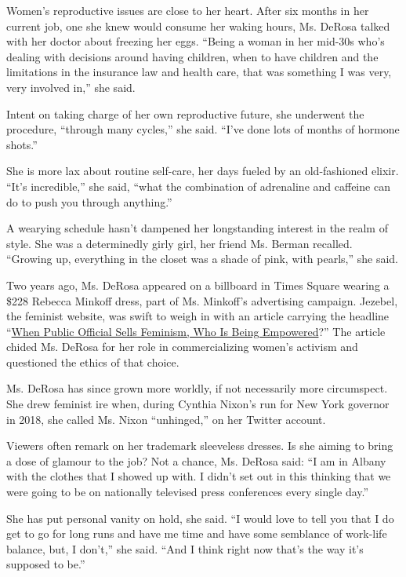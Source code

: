 Women's reproductive issues are close to her heart. After six months in
her current job, one she knew would consume her waking hours, Ms. DeRosa
talked with her doctor about freezing her eggs. ``Being a woman in her
mid-30s who's dealing with decisions around having children, when to
have children and the limitations in the insurance law and health care,
that was something I was very, very involved in,'' she said.

Intent on taking charge of her own reproductive future, she underwent
the procedure, ``through many cycles,'' she said. ``I've done lots of
months of hormone shots.''

She is more lax about routine self-care, her days fueled by an
old-fashioned elixir. ``It's incredible,'' she said, ``what the
combination of adrenaline and caffeine can do to push you through
anything.''

A wearying schedule hasn't dampened her longstanding interest in the
realm of style. She was a determinedly girly girl, her friend Ms. Berman
recalled. ``Growing up, everything in the closet was a shade of pink,
with pearls,'' she said.

Two years ago, Ms. DeRosa appeared on a billboard in Times Square
wearing a \$228 Rebecca Minkoff dress, part of Ms. Minkoff's advertising
campaign. Jezebel, the feminist website, was swift to weigh in with an
article carrying the headline
``\href{https://theslot.jezebel.com/when-a-public-official-sells-feminism-who-is-being-emp-1824125092}{When
Public Official Sells Feminism, Who Is Being Empowered}?'' The article
chided Ms. DeRosa for her role in commercializing women's activism and
questioned the ethics of that choice.

Ms. DeRosa has since grown more worldly, if not necessarily more
circumspect. She drew feminist ire when, during Cynthia Nixon's run for
New York governor in 2018, she called Ms. Nixon ``unhinged,'' on her
Twitter account.

Viewers often remark on her trademark sleeveless dresses. Is she aiming
to bring a dose of glamour to the job? Not a chance, Ms. DeRosa said:
``I am in Albany with the clothes that I showed up with. I didn't set
out in this thinking that we were going to be on nationally televised
press conferences every single day.''

She has put personal vanity on hold, she said. ``I would love to tell
you that I do get to go for long runs and have me time and have some
semblance of work-life balance, but, I don't,'' she said. ``And I think
right now that's the way it's supposed to be.''

